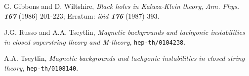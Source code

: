 \documentclass[a4paper,12pt]{article}
\begin{document}
\begin{thebibliography}{99}
    G. Gibbons and D. Wiltshire,
    {\sl Black holes in Kaluza-Klein theory},
    {\it Ann. Phys. \bf 167} (1986) 201-223;
    Erratum: {\it ibid \bf 176} (1987) 393.

    J.G. Russo and A.A. Tseytlin,
    {\sl Magnetic backgrounds and tachyonic instabilities in
         closed superstring theory and M-theory},
    {\tt hep-th/0104238}.

    A.A. Tseytlin,
    {\sl Magnetic backgrounds and tachyonic instabilities in
         closed string theory},
    {\tt hep-th/0108140}.

\end{thebibliography}
\end{document}
